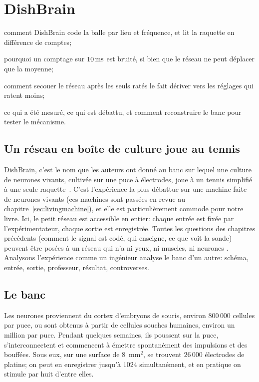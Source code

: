 \chapter{DishBrain}
\label{sec:dishbrain}
\begin{chaptergoals}
\item comment DishBrain code la balle par lieu et fréquence, et lit la raquette en différence de comptes;
\item pourquoi un comptage sur $10\,\text{ms}$ est bruité, si bien que le réseau ne peut déplacer que la moyenne;
\item comment secouer le réseau après les seuls ratés le fait dériver vers les réglages qui ratent moins;
\item ce qui a été mesuré, ce qui est débattu, et comment reconstruire le banc pour tester le mécanisme.
\end{chaptergoals}

\section{Un réseau en boîte de culture joue au tennis}

DishBrain, c'est le nom que les auteurs ont donné au banc sur lequel une culture de neurones vivants, cultivée sur une puce à électrodes, joue à un tennis simplifié à une seule raquette~\cite{Kagan2022}. C'est l'expérience la plus débattue sur une machine faite de neurones vivants (ces machines sont passées en revue au chapitre~\ref{sec:livingmachine}), et elle est particulièrement commode pour notre livre. Ici, le petit réseau est accessible en entier: chaque entrée est fixée par l'expérimentateur, chaque sortie est enregistrée. Toutes les questions des chapitres précédents (comment le signal est codé, qui enseigne, ce que voit la sonde) peuvent être posées à un réseau qui n'a ni yeux, ni muscles, ni neurones . Analysons l'expérience comme un ingénieur analyse le banc d'un autre: schéma, entrée, sortie, professeur, résultat, controverses.

\section{Le banc}

Les neurones proviennent du cortex d'embryons de souris, environ $800\,000$ cellules par puce, ou sont obtenus à partir de cellules souches humaines, environ un million par puce. Pendant quelques semaines, ils poussent sur la puce, s'interconnectent et commencent à émettre spontanément des impulsions et des bouffées. Sous eux, sur une surface de $8$~mm$^2$, se trouvent $26\,000$ électrodes de platine; on peut en enregistrer jusqu'à $1024$ simultanément, et en pratique on stimule par huit d'entre elles.

